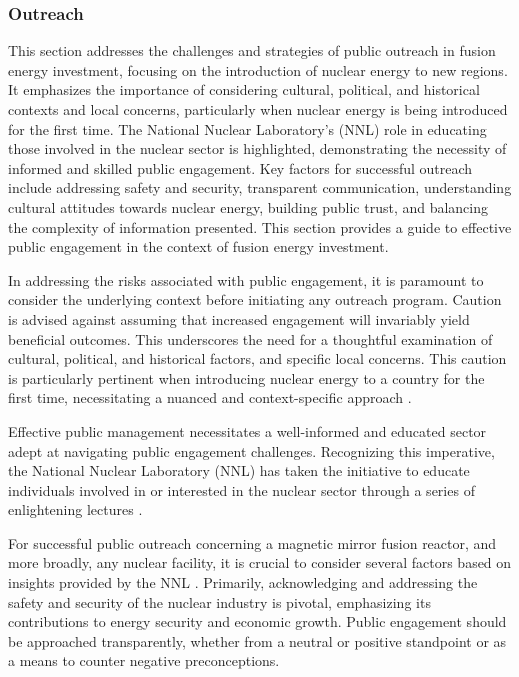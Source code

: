 \subsubsection{Outreach}

This section addresses the challenges and strategies of public outreach in fusion energy investment, focusing on the introduction of nuclear energy to new regions. It emphasizes the importance of considering cultural, political, and historical contexts and local concerns, particularly when nuclear energy is being introduced for the first time. The National Nuclear Laboratory's (NNL) role in educating those involved in the nuclear sector is highlighted, demonstrating the necessity of informed and skilled public engagement. Key factors for successful outreach include addressing safety and security, transparent communication, understanding cultural attitudes towards nuclear energy, building public trust, and balancing the complexity of information presented. This section provides a guide to effective public engagement in the context of fusion energy investment.

In addressing the risks associated with public engagement, it is paramount to consider the underlying context before initiating any outreach program. Caution is advised against assuming that increased engagement will invariably yield beneficial outcomes. This underscores the need for a thoughtful examination of cultural, political, and historical factors, and specific local concerns. This caution is particularly pertinent when introducing nuclear energy to a country for the first time, necessitating a nuanced and context-specific approach \cite{holmes2019developing}.

Effective public management necessitates a well-informed and educated sector adept at navigating public engagement challenges. Recognizing this imperative, the National Nuclear Laboratory (NNL) has taken the initiative to educate individuals involved in or interested in the nuclear sector through a series of enlightening lectures \cite{NNL2020}.

For successful public outreach concerning a magnetic mirror fusion reactor, and more broadly, any nuclear facility, it is crucial to consider several factors based on insights provided by the NNL \cite{holmes2019developing}. Primarily, acknowledging and addressing the safety and security of the nuclear industry is pivotal, emphasizing its contributions to energy security and economic growth. Public engagement should be approached transparently, whether from a neutral or positive standpoint or as a means to counter negative preconceptions.

